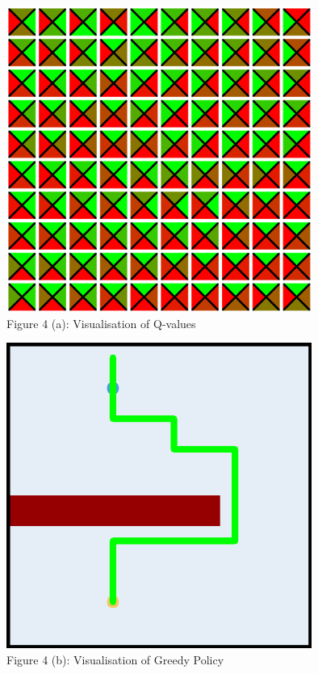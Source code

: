 \documentclass[12pt]{article}
\begin{document}
\clearpage
\begin{figure}
    \centering
    \includegraphics[width=10cm]{figures/4a.png}
    \caption*{Figure 4 (a): Visualisation of Q-values}
\end{figure}
\begin{figure}
    \centering
    \includegraphics[width=10cm]{figures/4b.png}
    \caption*{Figure 4 (b): Visualisation of Greedy Policy}
\end{figure}

\clearpage
\newpage 
\end{document}
